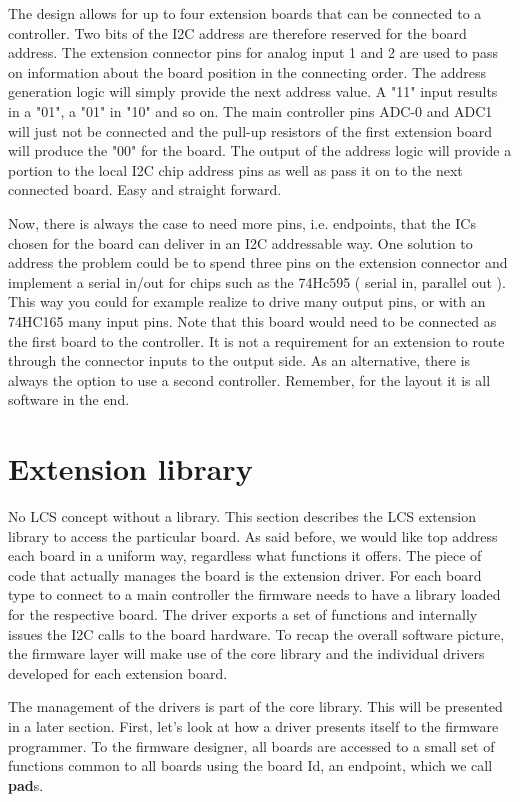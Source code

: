 The design allows for up to four extension boards that can be connected to a controller. Two bits of the I2C address are therefore reserved for the board address. The extension connector pins for analog input 1 and 2 are used to pass on information about the board position in the connecting order. The address generation logic will simply provide the next address value. A "11" input results in a "01", a "01" in "10" and so on. The main controller pins ADC-0 and ADC1 will just not be connected and the pull-up resistors of the first extension board will produce the "00" for the board. The output of the address logic will provide a portion to the  local I2C chip address pins as well as pass it on to the next connected board. Easy and straight forward.

Now, there is always the case to need more pins, i.e. endpoints, that the ICs chosen for the board can deliver in an I2C addressable way. One solution to address the problem could be to spend three pins on the extension connector and implement a serial in/out for chips such as the 74Hc595 ( serial in, parallel out ). This way you could for example realize to drive many output pins, or with an 74HC165 many input pins. Note that this board would need to be connected as the first board to the controller. It is not a requirement for an extension to route through the connector inputs to the output side. As an alternative, there is always the option to use a second controller. Remember, for the layout it is all software in the end.

\section{Extension library}

No LCS concept without a library. This section describes the LCS extension library to access the particular board. As said before, we would like top address each board in a uniform way, regardless what functions it offers. The piece of code that actually manages the board is the extension driver. For each board type to connect to a main controller the firmware needs to have a library loaded for the respective board. The driver exports a set of functions and internally issues the I2C calls to the board hardware. To recap the overall software picture, the firmware layer will make use of the core library and the individual drivers developed for each extension board.

The management of the drivers is part of the core library. This will be presented in a later section. First, let's look at how a driver presents itself to the firmware programmer. To the firmware designer, all boards are accessed to a small set of functions common to all boards using the board Id, an endpoint, which we call \textbf{pad}s.

